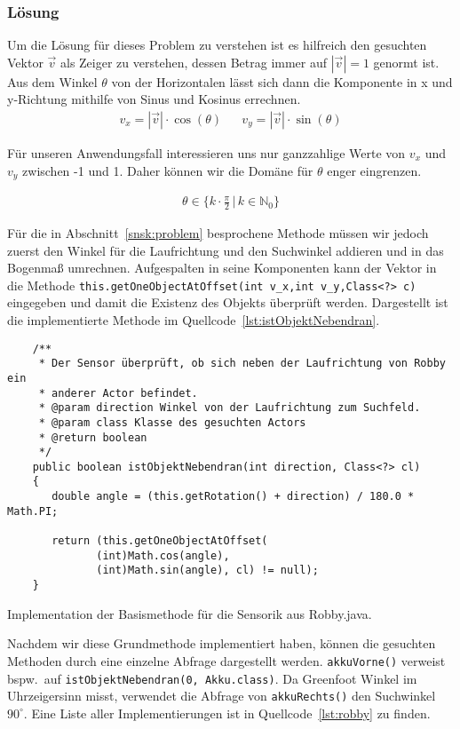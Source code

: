 \subsubsection*{Lösung}
\label{snsk:loesung}
Um die Lösung für dieses Problem zu verstehen ist es hilfreich den gesuchten Vektor $ \vec{v} $ als Zeiger zu verstehen, dessen Betrag immer auf $ \left| \vec{v} \right| = 1 $ genormt ist. Aus dem Winkel $ \theta $ von der Horizontalen lässt sich dann die Komponente in x und y-Richtung mithilfe von Sinus und Kosinus errechnen.
\begin{align}
  v_x = \left| \vec{v} \right| \cdot \cos (\theta) && v_y = \left| \vec{v} \right| \cdot \sin (\theta)
\end{align}

Für unseren Anwendungsfall interessieren uns nur ganzzahlige Werte von $v_x$ und $v_y$ zwischen -1 und 1. Daher können wir die Domäne für $\theta$ enger eingrenzen.

\begin{align}
  \theta \in \Big\{ k \cdot \frac{\pi}{2} \, | \, k \in \mathbb{N}_0 \Big\}
\end{align}

Für die in Abschnitt~\ref{snsk:problem} besprochene Methode müssen wir jedoch zuerst den Winkel für die Laufrichtung und den Suchwinkel addieren und in das Bogenma\ss{} umrechnen. Aufgespalten in seine Komponenten kann der Vektor in die Methode \texttt{this.getOneObjectAtOffset(int v_x,int v_y,Class<?> c)} eingegeben und damit die Existenz des Objekts überprüft werden. Dargestellt ist die implementierte Methode im Quellcode~\ref{lst:istObjektNebendran}.
\begin{listing}
  \begin{verbatim}
    /**
     * Der Sensor überprüft, ob sich neben der Laufrichtung von Robby ein
     * anderer Actor befindet.
     * @param direction Winkel von der Laufrichtung zum Suchfeld.
     * @param class Klasse des gesuchten Actors
     * @return boolean
     */
    public boolean istObjektNebendran(int direction, Class<?> cl)
    {
       double angle = (this.getRotation() + direction) / 180.0 * Math.PI;

       return (this.getOneObjectAtOffset(
              (int)Math.cos(angle),
              (int)Math.sin(angle), cl) != null);
    }
  \end{verbatim}
  \caption{Implementation der Basismethode für die Sensorik aus Robby.java. }
  \label{lst:istObjektNebendran}
\end{listing}

Nachdem wir diese Grundmethode implementiert haben, können die gesuchten Methoden durch eine einzelne Abfrage dargestellt werden. \texttt{akkuVorne()} verweist bspw.\ auf  \texttt{istObjektNebendran(0, Akku.class)}. Da Greenfoot Winkel im Uhrzeigersinn misst, verwendet die Abfrage von \texttt{akkuRechts()} den Suchwinkel $90^\circ$. Eine Liste aller Implementierungen ist in Quellcode~\ref{lst:robby} zu finden.
